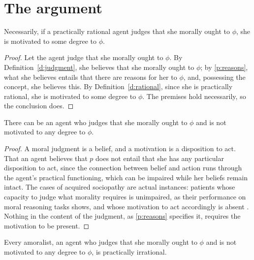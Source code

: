 \documentclass{situationist-preprint}
\begin{document}
\section{The argument}

\begin{theorem}\label{t:main}
Necessarily, if a practically rational agent judges that she morally ought to $\phi$, she is motivated to some degree to $\phi$.
\end{theorem}

\begin{proof}
Let the agent judge that she morally ought to $\phi$. By Definition~\ref{d:judgment}, she believes that she morally ought to $\phi$; by \ref{p:reasons}, what she believes entails that there are reasons for her to $\phi$, and, possessing the concept, she believes this. By Definition~\ref{d:rational}, since she is practically rational, she is motivated to some degree to $\phi$. The premises hold necessarily, so the conclusion does.
\end{proof}

\begin{proposition}\label{p:possible}
There can be an agent who judges that she morally ought to $\phi$ and is not motivated to any degree to $\phi$.
\end{proposition}

\begin{proof}
A moral judgment is a belief, and a motivation is a disposition to act. That an agent believes that $p$ does not entail that she has any particular disposition to act, since the connection between belief and action runs through the agent's practical functioning, which can be impaired while her beliefs remain intact. The cases of acquired sociopathy are actual instances: patients whose capacity to judge what morality requires is unimpaired, as their performance on moral reasoning tasks shows, and whose motivation to act accordingly is absent \citep{Roskies2003}. Nothing in the content of the judgment, as \ref{p:reasons} specifies it, requires the motivation to be present.
\end{proof}

\begin{corollary}\label{c:irrational}
Every amoralist, an agent who judges that she morally ought to $\phi$ and is not motivated to any degree to $\phi$, is practically irrational.
\end{corollary}
\end{document}
